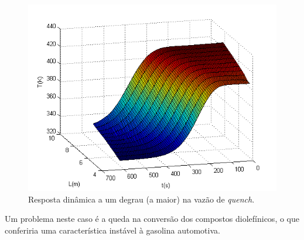\begin{figure}[htb]
\centering
\includegraphics[scale=0.8]{images/Chap4/QuenchF30790.png}
\caption{Resposta dinâmica a um degrau (a maior) na vazão de \emph{quench}.}
\label{fig:QuenchF30790}
\end{figure}

Um problema neste caso é a queda na conversão dos compostos diolefínicos, o
que conferiria uma característica instável à gasolina automotiva.









